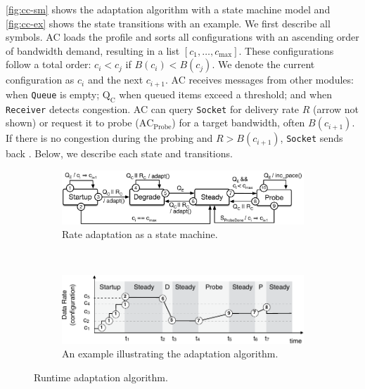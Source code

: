 \autoref{fig:cc-sm} shows the adaptation algorithm with a state machine model
and \autoref{fig:cc-ex} shows the state transitions with an example. We first
describe all symbols. AC loads the profile and sorts all configurations with an
ascending order of bandwidth demand, resulting in a list
$[c_1, \dots, c_{\max}]$.  These configurations follow a total order:
$c_i < c_j$ if $B(c_i) < B(c_j)$.  We denote the current configuration as $c_i$
and the next $c_{i+1}$.  AC receives messages from other modules: \qe{} when
\texttt{Queue} is empty; $\text{Q}_\text{C}$ when queued items exceed a
threshold; and \rc{} when \texttt{Receiver} detects congestion. AC can query
\texttt{Socket} for delivery rate $R$ (arrow not shown) or request it to probe
($\text{AC}_{\text{Probe}}$) for a target bandwidth, often $B(c_{i+1})$. If
there is no congestion during the probing and $R > B(c_{i+1})$, \texttt{Socket}
sends back \spd{}. Below, we describe each state and transitions.

\begin{figure}
  \begin{subfigure}[t]{\columnwidth}
    \centering
    \includegraphics[width=\columnwidth]{figures/cc.pdf}
    \caption{Rate adaptation as a state machine.}
    \label{fig:cc-sm}
  \end{subfigure}
  \\
  \vspace{1em}
  \centering
  \begin{subfigure}[t]{\columnwidth}
    \centering
    \includegraphics[width=0.9\columnwidth]{figures/cc2.pdf}
    \caption{An example illustrating the adaptation algorithm.}
    \label{fig:cc-ex}
  \end{subfigure}
  \caption{Runtime adaptation algorithm.}
  \label{fig:cc}
\end{figure}

